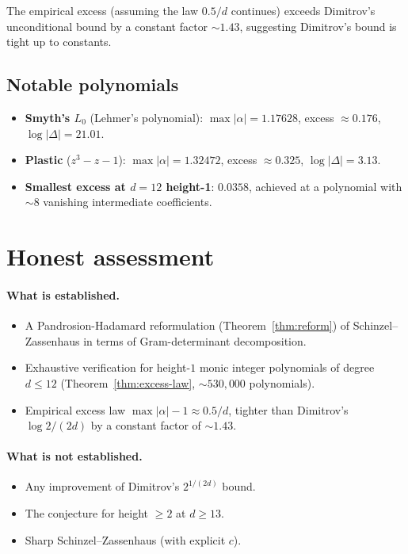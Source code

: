 \documentclass[11pt,a4paper]{article}
\begin{document}
The empirical excess (assuming the law $0.5/d$ continues) exceeds Dimitrov's
unconditional bound by a constant factor $\sim 1.43$, suggesting Dimitrov's
bound is tight up to constants.

\subsection{Notable polynomials}
\begin{itemize}
\item \textbf{Smyth's $L_0$} (Lehmer's polynomial): $\max|\alpha| = 1.17628$,
excess $\approx 0.176$, $\log|\Delta| = 21.01$.
\item \textbf{Plastic} ($z^3 - z - 1$): $\max|\alpha| = 1.32472$, excess
$\approx 0.325$, $\log|\Delta| = 3.13$.
\item \textbf{Smallest excess at $d = 12$ height-1}: $0.0358$, achieved at a
polynomial with $\sim 8$ vanishing intermediate coefficients.
\end{itemize}

\section{Honest assessment}\label{sec:assessment}

\paragraph{What is established.}
\begin{itemize}
\item A Pandrosion-Hadamard reformulation
(Theorem~\ref{thm:reform}) of Schinzel--Zassenhaus in terms of Gram-determinant
decomposition.
\item Exhaustive verification for height-$1$ monic integer polynomials of
degree $d \le 12$ (Theorem~\ref{thm:excess-law}, $\sim 530{,}000$ polynomials).
\item Empirical excess law $\max|\alpha| - 1 \approx 0.5/d$, tighter than
Dimitrov's $\log 2/(2d)$ by a constant factor of $\sim 1.43$.
\end{itemize}

\paragraph{What is not established.}
\begin{itemize}
\item Any improvement of Dimitrov's $2^{1/(2d)}$ bound.
\item The conjecture for height $\ge 2$ at $d \ge 13$.
\item Sharp Schinzel--Zassenhaus (with explicit $c$).
\end{itemize}
\end{document}
